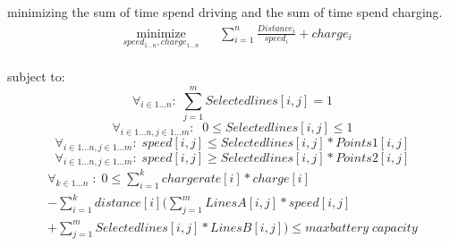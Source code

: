 minimizing the sum of time spend driving and the sum of time spend charging. 
\begin{equation}
\begin{aligned}
 & \underset{speed_{1 \dots n},charge_{1 \dots n}}
{\text{minimize}}
& & \sum_{i=1}^{n} \frac{Distance_i}{speed_i} + charge_i \\
\end{aligned}
\end{equation}\label{eq:objfunction}

subject to: 
\begin{equation}
\forall_{i\in1 \dots n }:\; \sum_{j=1}^{m} Selectedlines[i,j] = 1
\end{equation}
\begin{equation}
\forall_{i\in1 \dots n, j \in 1 \dots m}: \; \;0\leq Selectedlines[i,j] \leq 1
\end{equation}
\begin{equation}
\forall_{i\in1 \dots n, j \in 1 \dots m}:\; speed[i,j] \le Selectedlines[i,j] * Points1[i,j]
\end{equation}
\begin{equation}
\forall_{i\in1 \dots n, j \in 1 \dots m}:\; speed[i,j] \ge Selectedlines[i,j] * Points2[i,j]
\end{equation}
\begin{equation}
\begin{split}
\forall_{k\in1 \dots n}\;:\;0 \le\sum_{i=1}^{k}chargerate[i]*charge[i]\\
-\sum_{i=1}^{k} distance[i](\sum_{j=1}^{m} LinesA[i,j]*speed[i,j]\\
+\sum_{j=1}^{m} Selectedlines[i,j]*LinesB[i,j]) \le maxbattery\;capacity
\end{split}
\end{equation}